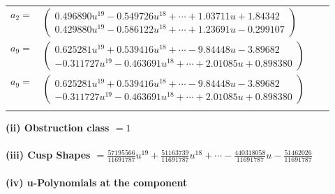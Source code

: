 \documentclass[1p]{elsarticle_modified}
\theoremstyle{definition}
\begin{document}
\begin{tabular}{m{7pt} m{180pt} m{7pt} m{180pt} }
\flushright $a_{2}=$&$\begin{pmatrix}0.496890 u^{19}-0.549726 u^{18}+\cdots+1.03711 u+1.84342\\0.429880 u^{19}-0.586122 u^{18}+\cdots+1.23691 u-0.299107\end{pmatrix}$ \\
\flushright $a_{9}=$&$\begin{pmatrix}0.625281 u^{19}+0.539416 u^{18}+\cdots-9.84448 u-3.89682\\-0.311727 u^{19}-0.463691 u^{18}+\cdots+2.01085 u+0.898380\end{pmatrix}$\\ \flushright $a_{9}=$&$\begin{pmatrix}0.625281 u^{19}+0.539416 u^{18}+\cdots-9.84448 u-3.89682\\-0.311727 u^{19}-0.463691 u^{18}+\cdots+2.01085 u+0.898380\end{pmatrix}$\\&\end{tabular}
\flushleft \textbf{(ii) Obstruction class $= 1$}\\~\\
\flushleft \textbf{(iii) Cusp Shapes $= \frac{57195566}{11691787} u^{19}+\frac{51163739}{11691787} u^{18}+\cdots-\frac{440318058}{11691787} u-\frac{51462026}{11691787}$}\\~\\
\newpage\renewcommand{\arraystretch}{1}
\flushleft \textbf{(iv) u-Polynomials at the component}\newline \\
\end{document}
